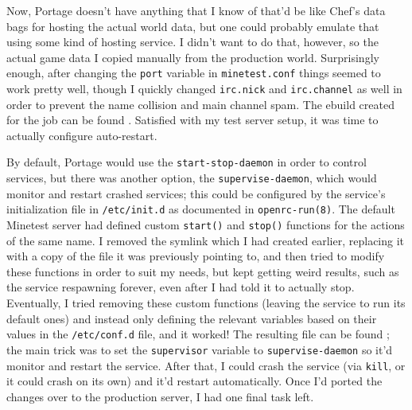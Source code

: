 \documentclass{article}
\begin{document}
Now, Portage doesn't have anything that I know of that'd be like Chef's data bags for hosting the actual world data, but one could probably emulate that using some kind of hosting service.  I didn't want to do that, however, so the actual game data I copied manually from the production world.  Surprisingly enough, after changing the \texttt{port} variable in \texttt{minetest.conf} things seemed to work pretty well, though I quickly changed \texttt{irc.nick} and \texttt{irc.channel} as well in order to prevent the name collision and main channel spam.  The ebuild created for the job can be found .  Satisfied with my test server setup, it was time to actually configure auto-restart.

By default, Portage would use the \texttt{start-stop-daemon} in order to control services, but there was another option, the \texttt{supervise-daemon}, which would monitor and restart crashed services; this could be configured by the service's initialization file in \texttt{/etc/init.d} as documented in \texttt{openrc-run(8)}.  The default Minetest server had defined custom \texttt{start()} and \texttt{stop()} functions for the actions of the same name.  I removed the symlink which I had created earlier, replacing it with a copy of the file it was previously pointing to, and then tried to modify these functions in order to suit my needs, but kept getting weird results, such as the service respawning forever, even after I had told it to actually stop.  Eventually, I tried removing these custom functions (leaving the service to run its default ones) and instead only defining the relevant variables based on their values in the \texttt{/etc/conf.d} file, and it worked!  The resulting file can be found ; the main trick was to set the \texttt{supervisor} variable to \texttt{supervise-daemon} so it'd monitor and restart the service.  After that, I could crash the service (via \texttt{kill}, or it could crash on its own) and it'd restart automatically.  Once I'd ported the changes over to the production server, I had one final task left.
\end{document}

